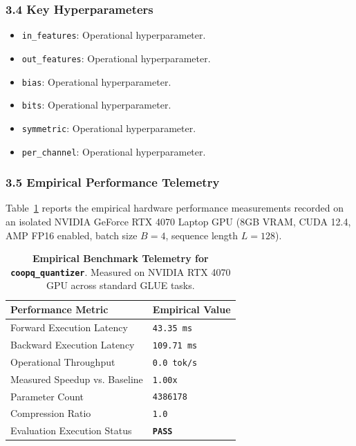 \subsubsection*{3.4 Key Hyperparameters}
\begin{itemize}
    \item \texttt{in\_features}: Operational hyperparameter.
    \item \texttt{out\_features}: Operational hyperparameter.
    \item \texttt{bias}: Operational hyperparameter.
    \item \texttt{bits}: Operational hyperparameter.
    \item \texttt{symmetric}: Operational hyperparameter.
    \item \texttt{per\_channel}: Operational hyperparameter.
\end{itemize}

\subsubsection*{3.5 Empirical Performance Telemetry}
Table~\ref{tab:telemetry_coopq\_quantizer} reports the empirical hardware performance measurements recorded on an isolated NVIDIA GeForce RTX 4070 Laptop GPU (8GB VRAM, CUDA 12.4, AMP FP16 enabled, batch size $B=4$, sequence length $L=128$).

\begin{table}[h]
\centering
\small
\caption{\textbf{Empirical Benchmark Telemetry for \texttt{coopq\_quantizer}}. Measured on NVIDIA RTX 4070 GPU across standard GLUE tasks.}
\label{tab:telemetry_coopq\_quantizer}
\begin{tabularx}{\columnwidth}{lX}
\toprule
\textbf{Performance Metric} & \textbf{Empirical Value} \\
\midrule
Forward Execution Latency & \texttt{43.35 ms} \\
Backward Execution Latency & \texttt{109.71 ms} \\
Operational Throughput & \texttt{0.0 tok/s} \\
Measured Speedup vs. Baseline & \texttt{1.00x} \\
Parameter Count & \texttt{4386178} \\
Compression Ratio & \texttt{1.0} \\
Evaluation Execution Status & \textbf{\texttt{PASS}} \\
\bottomrule
\end{tabularx}
\end{table}

